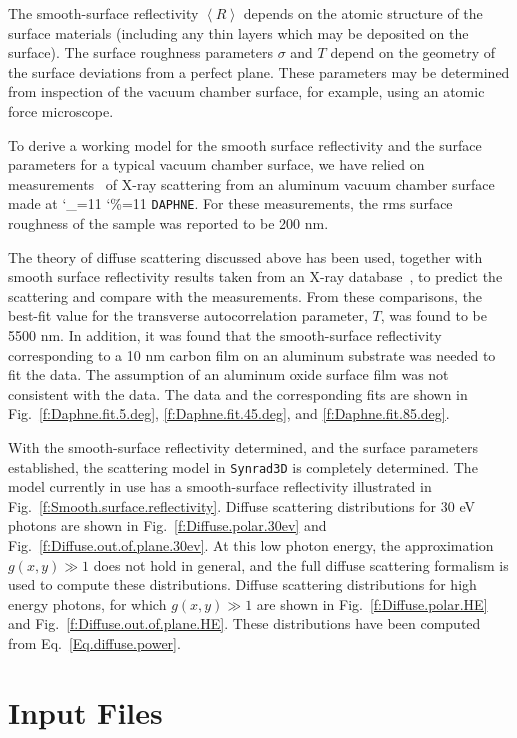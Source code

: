 \documentclass[11pt]{article}
\newcommand{\srthree}{\texttt{Synrad3D}\xspace}
\newcommand\ttcmd{\begingroup\catcode`\_=11 \catcode`\%=11 \dottcmd}
\newcommand\dottcmd[1]{\texttt{#1}\endgroup}
\newcommand{\vn}{\ttcmd}
\begin{document}
The smooth-surface reflectivity $\left<R\right>$ depends on the atomic
structure of the surface materials (including any thin layers which
may be deposited on the surface). The surface roughness parameters
$\sigma$ and $T$ depend on the geometry of the surface deviations from
a perfect plane. These parameters may be determined from inspection of
the vacuum chamber surface, for example, using an atomic force
microscope.

To derive a working model for the smooth surface reflectivity and the
surface parameters for a typical vacuum chamber surface, we have
relied on measurements~\cite{b:mehne} of X-ray scattering
from an aluminum vacuum chamber surface made at \vn{DAPHNE}. For
these measurements, the rms surface roughness of the sample was
reported to be 200 nm.

The theory of diffuse scattering discussed above has been used,
together with smooth surface reflectivity results taken from an X-ray
database~\cite{b:henke}, to predict the scattering and compare with
the measurements. From these comparisons, the best-fit value for the
transverse autocorrelation parameter, $T$, was found to be 5500 nm. In
addition, it was found that the smooth-surface reflectivity
corresponding to a 10 nm carbon film on an aluminum substrate was
needed to fit the data. The assumption of an aluminum oxide surface
film was not consistent with the data. The data and the corresponding
fits are shown in Fig.~\ref{f:Daphne.fit.5.deg},
\ref{f:Daphne.fit.45.deg}, and \ref{f:Daphne.fit.85.deg}.

With the smooth-surface reflectivity determined, and the surface
parameters established, the scattering model in \srthree is
completely determined. The model currently in use has a smooth-surface
reflectivity illustrated in
Fig.~\ref{f:Smooth.surface.reflectivity}. Diffuse
scattering distributions for 30 eV photons are shown in
Fig.~\ref{f:Diffuse.polar.30ev} and
Fig.~\ref{f:Diffuse.out.of.plane.30ev}. At this low photon
energy, the approximation $g(x,y)\gg 1$ does not hold in general, and
the full diffuse scattering formalism is used to compute these
distributions. Diffuse scattering distributions for high energy
photons, for which $g(x,y)\gg 1$ are shown in
Fig.~\ref{f:Diffuse.polar.HE} and
Fig.~\ref{f:Diffuse.out.of.plane.HE}. These distributions
have been computed from Eq.~\ref{Eq.diffuse.power}.

\section{Input Files} 
\label{s:prog}
\end{document}
